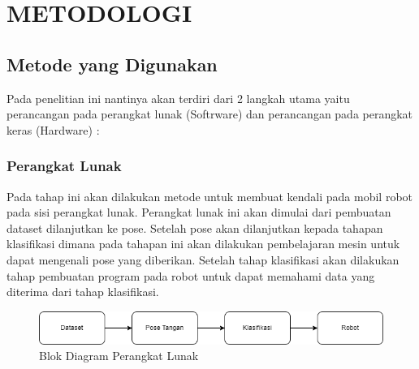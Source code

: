 \section{METODOLOGI}


\subsection{Metode yang Digunakan}

Pada penelitian ini nantinya akan terdiri dari 2 langkah utama yaitu perancangan pada perangkat lunak (Softrware) dan perancangan pada perangkat keras (Hardware) :

\subsubsection{Perangkat Lunak}
Pada tahap ini akan dilakukan metode untuk membuat kendali pada mobil robot pada sisi perangkat lunak. Perangkat lunak ini akan dimulai dari pembuatan dataset dilanjutkan ke pose. Setelah pose akan dilanjutkan kepada tahapan klasifikasi dimana pada tahapan ini akan dilakukan pembelajaran mesin untuk dapat mengenali pose yang diberikan. Setelah tahap klasifikasi akan dilakukan tahap pembuatan program pada robot untuk dapat memahami data yang diterima dari tahap klasifikasi.

\begin{figure}[!h]
	\centering
	\includegraphics[width=1\linewidth]{gambar/gambar3.1}
	\caption{Blok Diagram Perangkat Lunak}
	\label{fig:gambar31}
\end{figure}

